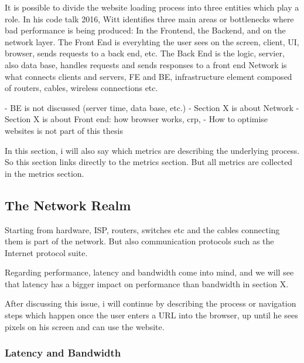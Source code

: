 It is possible to divide the website loading process into three entities which play a role.
In his code talk 2016, Witt identifies three main areas or bottlenecks where bad performance is being produced: In the Frontend, the Backend, and on the network layer.  %
The Front End is everyhting the user sees on the screen, client, UI, browser, sends requests to a back end, etc.
The Back End is the logic, servier, also data base, handles requests and sends responses to a front end
Network is what connects clients and servers, FE and BE, infrastructure element composed of routers, cables, wireless connections etc.


- BE is not discussed (server time, data base, etc.)
- Section X is about Network
- Section X is about Front end: how browser works, crp, 
- How to optimise websites is not part of this thesis

In this section, i will also say which metrics are describing the underlying process.
So this section links directly to the metrics section.
But all metrics are collected in the metrics section.





\subsection{The Network Realm}

Starting from hardware, ISP, routers, switches etc and the cables connecting them is part of the network.
But also communication protocols such as the Internet protocol suite.

Regarding performance, latency and bandwidth come into mind, and we will see that latency has a bigger impact on performance than bandwidth in section X.

After discussing this issue, i will continue by describing the process or navigation steps which happen once the user enters a URL into the browser, up until he sees pixels on his screen and can use the website.




\subsubsection{Latency and Bandwidth}

